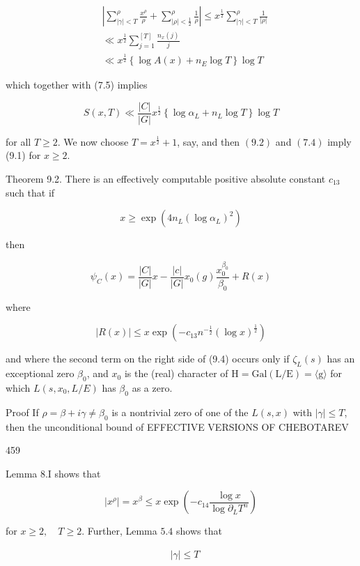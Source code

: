 $$
\begin{aligned}
& \left|\sum_{|\gamma|<T}^{\rho} \frac{x^{\rho}}{\rho}+\sum_{|\rho|<\frac{1}{2}}^{\rho} \frac{1}{\rho}\right| \leqslant x^{\frac{1}{2}} \sum_{|\gamma|<T}^{\rho} \frac{1}{|\rho|} \\
& \ll x^{\frac{1}{2}} \sum_{j=1}^{[T]} \frac{n_{x}(j)}{j} \\
& \ll x^{\frac{1}{2}}\left\{\log A(x)+n_{E} \log T\right\} \log T 
\end{aligned}
$$

which together with (7.5) implies

$$
S(x, T) \ll \frac{|C|}{|G|} x^{\frac{1}{2}}\left\{\log \alpha_{L}+n_{L} \log T\right\} \log T
$$

for all $T \geqslant 2$. We now choose $T=x^{\frac{1}{2}}+1$, say, and then $(9.2)$ and $(7.4)$ imply (9.1) for $x \geqslant 2$.

Theorem 9.2. There is an effectively computable positive absolute constant $c_{13}$ such that if

$$
x \geqslant \exp \left(4 n_{L}\left(\log \alpha_{L}\right)^{2}\right)
$$

then

$$
\psi_{C}(x)=\frac{|C|}{|G|} x-\frac{|c|}{|G|} x_{0}(g) \frac{x_{0}^{\beta_{0}}}{\beta_{0}}+R(x)
$$

where

$$
|R(x)| \leqslant x \exp \left(-c_{13} n^{-\frac{1}{2}}(\log x)^{\frac{1}{2}}\right)
$$

and where the second term on the right side of (9.4) occurs only if $\zeta_{L}(s)$ has an exceptional zero $\beta_{0}$, and $x_{0}$ is the (real) character of $\mathrm{H}=\mathrm{Gal}(\mathrm{L} / \mathrm{E})=\langle\mathrm{g}\rangle$ for which $L\left(s, x_{0}, L / E\right)$ has $\beta_{0}$ as a zero.

Proof If $\rho=\beta+i \gamma \neq \beta_{0}$ is a nontrivial zero of one of the $L(s, x)$ with $|\gamma| \leqslant T$, then the unconditional bound of EFFECTIVE VERSIONS OF CHEBOTAREV

459

Lemma 8.I shows that

$$
\left|x^{\rho}\right|=x^{\beta} \leqslant x \exp \left(-c_{14} \frac{\log x}{\log \partial_{L} T^{n}}\right)
$$

for $x \geqslant 2, \quad T \geqslant 2$. Further, Lemma $5.4$ shows that

$$
\begin{aligned}
& |\gamma| \leqslant T
\end{aligned}
$$


